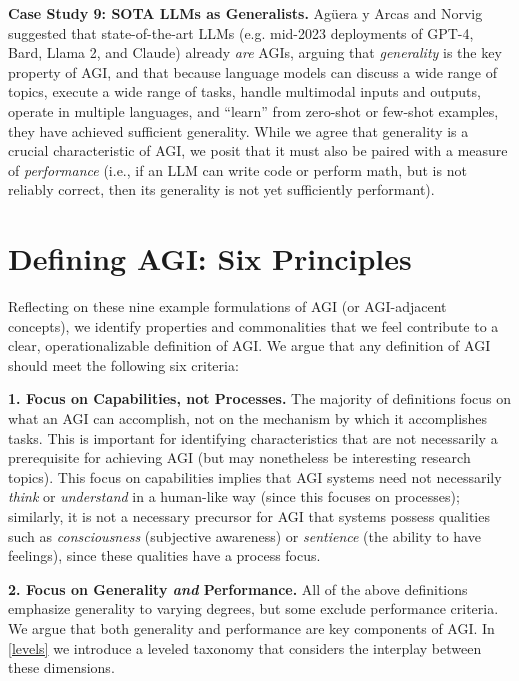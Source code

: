 \documentclass{article}
\theoremstyle{plain}
\theoremstyle{definition}
\theoremstyle{remark}
\begin{document}
\textbf{Case Study 9: SOTA LLMs as Generalists.} Ag\"uera y Arcas and Norvig \citep{blaiseAGI} suggested that state-of-the-art LLMs (e.g. mid-2023 deployments of GPT-4, Bard, Llama 2, and Claude) already \textit{are} AGIs, arguing that \textit{generality} is the key property of AGI, and that because language models can discuss a wide range of topics, execute a wide range of tasks, handle multimodal inputs and outputs, operate in multiple languages, and “learn” from zero-shot or few-shot examples, they have achieved sufficient generality. While we agree that generality is a crucial characteristic of AGI, we posit that it must also be paired with a measure of \textit{performance} (i.e., if an LLM can write code or perform math, but is not reliably correct, then its generality is not yet sufficiently performant).

\section{Defining AGI: Six Principles}
\label{principles}

Reflecting on these nine example formulations of AGI (or AGI-adjacent concepts), we identify properties and commonalities that we feel contribute to a clear, operationalizable definition of AGI. We argue that any definition of AGI should meet the following six criteria:

\textbf{1. Focus on Capabilities, not Processes.} The majority of definitions focus on what an AGI can accomplish, not on the mechanism by which it accomplishes tasks. This is important for identifying characteristics that are not necessarily a prerequisite for achieving AGI (but may nonetheless be interesting research topics). This focus on capabilities implies that AGI systems need not necessarily \textit{think} or \textit{understand} in a human-like way (since this focuses on processes); similarly, it is not a necessary precursor for AGI that systems possess qualities such as \textit{consciousness} (subjective awareness) \citep{butlin2023consciousness} or \textit{sentience} (the ability to have feelings), since these qualities have a process focus. 


\textbf{2. Focus on Generality \textit{and} Performance.} All of the above definitions emphasize generality to varying degrees, but some exclude performance criteria. We argue that both generality and performance are key components of AGI. In \cref{levels} we introduce a leveled taxonomy that considers the interplay between these dimensions.
\end{document}
